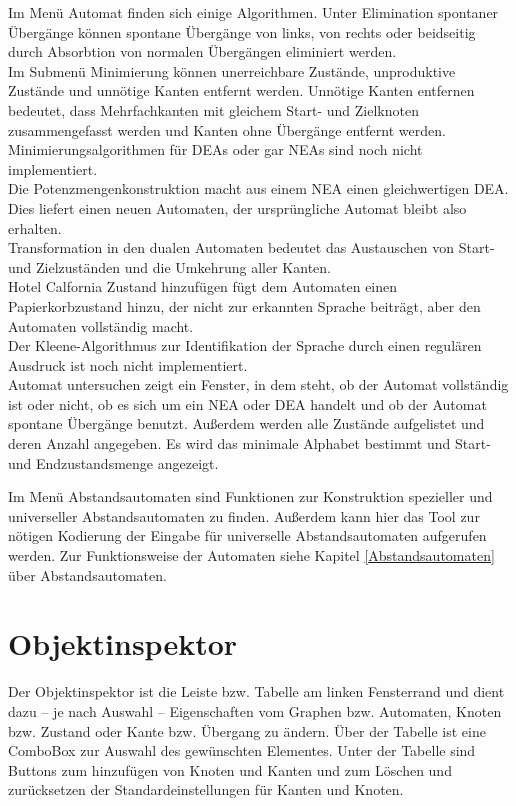 Im Menü Automat finden sich einige Algorithmen. Unter Elimination spontaner Übergänge können spontane Übergänge von links, von rechts oder beidseitig durch Absorbtion von normalen Übergängen eliminiert werden.\\
Im Submenü Minimierung können unerreichbare Zustände, unproduktive Zustände und unnötige Kanten entfernt werden. Unnötige Kanten entfernen bedeutet, dass Mehrfachkanten mit gleichem Start- und Zielknoten zusammengefasst werden und Kanten ohne Übergänge entfernt werden. Minimierungsalgorithmen für DEAs oder gar NEAs sind noch nicht implementiert.\\
Die Potenzmengenkonstruktion macht aus einem NEA einen gleichwertigen DEA. Dies liefert einen neuen Automaten, der ursprüngliche Automat bleibt also erhalten.\\
Transformation in den dualen Automaten bedeutet das Austauschen von Start- und Zielzuständen und die Umkehrung aller Kanten.\\
Hotel Calfornia Zustand hinzufügen fügt dem Automaten einen Papierkorbzustand hinzu, der nicht zur erkannten Sprache beiträgt, aber den Automaten vollständig macht.\\
Der Kleene-Algorithmus zur Identifikation der Sprache durch einen regulären Ausdruck ist noch nicht implementiert.\\
Automat untersuchen zeigt ein Fenster, in dem steht, ob der Automat vollständig ist oder nicht, ob es sich um ein NEA oder DEA handelt und ob der Automat spontane Übergänge benutzt. Außerdem werden alle Zustände aufgelistet und deren Anzahl angegeben. Es wird das minimale Alphabet bestimmt und Start- und Endzustandsmenge angezeigt.

Im Menü Abstandsautomaten sind Funktionen zur Konstruktion spezieller und universeller Abstandsautomaten zu finden. Außerdem kann hier das Tool zur nötigen Kodierung der Eingabe für universelle Abstandsautomaten aufgerufen werden. Zur Funktionsweise der Automaten siehe Kapitel \ref{Abstandsautomaten} über Abstandsautomaten.
\section{Objektinspektor}
Der Objektinspektor ist die Leiste bzw. Tabelle am linken Fensterrand und dient dazu – je nach  Auswahl – Eigenschaften vom Graphen bzw. Automaten, Knoten bzw. Zustand oder Kante bzw. Übergang zu ändern. Über der Tabelle ist eine ComboBox zur Auswahl des gewünschten Elementes. Unter der Tabelle sind Buttons zum hinzufügen von Knoten und Kanten und zum Löschen und zurücksetzen der Standardeinstellungen für Kanten und Knoten.
